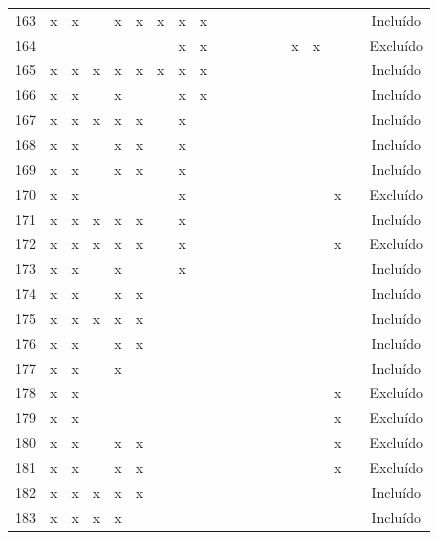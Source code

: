 \documentclass[
	12pt,				%
	oneside,			%
	a4paper,			%
	english,			%
	brazil				%
	]{abntex2ppgsi}
\begin{document}
\begin{apendicesenv}
\begin{table}[H]
\begin{tabular}{c | c c c c c c c c | c c c c c c c c c | c}
163 & x & x &   & x & x & x & x & x &   &   &   &   &   &   &   &   &   & Incluído \\
164 &   &   &   &   &   &   & x & x &   &   &   &   &   & x & x &   &   & Excluído \\
165 & x & x & x & x & x & x & x & x &   &   &   &   &   &   &   &   &   & Incluído \\
166 & x & x &   & x &   &   & x & x &   &   &   &   &   &   &   &   &   & Incluído \\
167 & x & x & x & x & x &   & x &   &   &   &   &   &   &   &   &   &   & Incluído \\
168 & x & x &   & x & x &   & x &   &   &   &   &   &   &   &   &   &   & Incluído \\
169 & x & x &   & x & x &   & x &   &   &   &   &   &   &   &   &   &   & Incluído \\
170 & x & x &   &   &   &   & x &   &   &   &   &   &   &   &   & x &   & Excluído \\
171 & x & x & x & x & x &   & x &   &   &   &   &   &   &   &   &   &   & Incluído \\
172 & x & x & x & x & x &   & x &   &   &   &   &   &   &   &   & x &   & Excluído \\
173 & x & x &   & x &   &   & x &   &   &   &   &   &   &   &   &   &   & Incluído \\
174 & x & x &   & x & x &   &   &   &   &   &   &   &   &   &   &   &   & Incluído \\
175 & x & x & x & x & x &   &   &   &   &   &   &   &   &   &   &   &   & Incluído \\
176 & x & x &   & x & x &   &   &   &   &   &   &   &   &   &   &   &   & Incluído \\
177 & x & x &   & x &   &   &   &   &   &   &   &   &   &   &   &   &   & Incluído \\
178 & x & x &   &   &   &   &   &   &   &   &   &   &   &   &   & x &   & Excluído \\
179 & x & x &   &   &   &   &   &   &   &   &   &   &   &   &   & x &   & Excluído \\
180 & x & x &   & x & x &   &   &   &   &   &   &   &   &   &   & x &   & Excluído \\
181 & x & x &   & x & x &   &   &   &   &   &   &   &   &   &   & x &   & Excluído \\
182 & x & x & x & x & x &   &   &   &   &   &   &   &   &   &   &   &   & Incluído \\
183 & x & x & x & x &   &   &   &   &   &   &   &   &   &   &   &   &   & Incluído \\

\end{tabular}
\end{table}
\end{apendicesenv}
\end{document}

